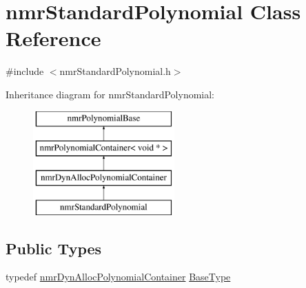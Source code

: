 \hypertarget{classnmr_standard_polynomial}{}\section{nmr\+Standard\+Polynomial Class Reference}
\label{classnmr_standard_polynomial}


{\ttfamily \#include $<$nmr\+Standard\+Polynomial.\+h$>$}

Inheritance diagram for nmr\+Standard\+Polynomial\+:\begin{figure}[H]
\begin{center}
\leavevmode
\includegraphics[height=4.000000cm]{d5/d1e/classnmr_standard_polynomial}
\end{center}
\end{figure}
\subsection*{Public Types}
\begin{DoxyCompactItemize}
\item 
typedef \hyperlink{classnmr_dyn_alloc_polynomial_container}{nmr\+Dyn\+Alloc\+Polynomial\+Container} \hyperlink{classnmr_standard_polynomial_ae0b28e9d73a5480047ee5d85be633b89}{Base\+Type}
\end{DoxyCompactItemize}
